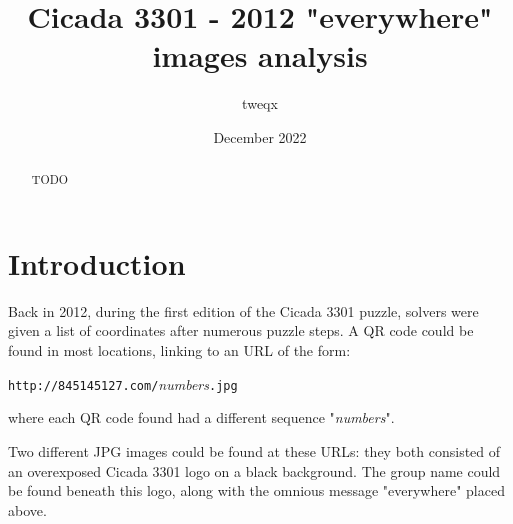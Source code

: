 \documentclass{article}
\begin{document}
\title{Cicada 3301 - 2012 "everywhere" images analysis}
\author{tweqx} %
\date{December 2022}
\maketitle

\begin{abstract}
	{\color{red} TODO}
\end{abstract}

\section{Introduction}

Back in 2012, during the first edition of the Cicada 3301 puzzle, solvers were given a list of coordinates after numerous puzzle steps. A QR code could be found in most locations, linking to an URL of the form:
\begin{center}
	\texttt{http://845145127.com/}\textit{numbers}\texttt{.jpg}
\end{center}

\noindent where each QR code found had a different sequence "\textit{numbers}".

Two different JPG images could be found at these URLs: they both consisted of an overexposed Cicada 3301 logo on a black background. The group name could be found beneath this logo, along with the omnious message "everywhere" placed above.
\end{document}
